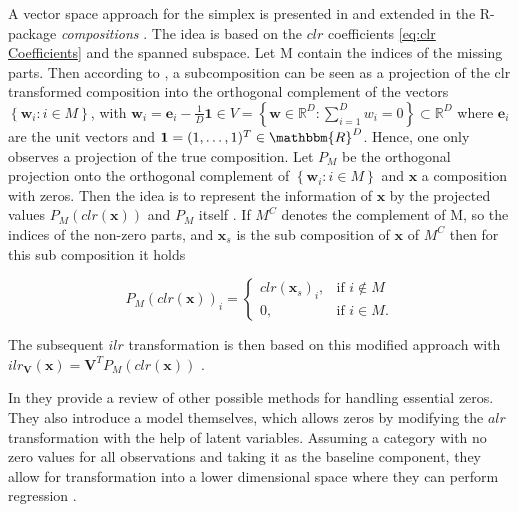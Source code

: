 A vector space approach for the simplex is presented in \cite{Boogaart:2006} and extended in the R-package \textit{compositions} \cite{Compositions:2023}. The idea is based on the $clr$ coefficients \ref{eq:clr Coefficients} and the spanned subspace. Let M contain the indices of the missing parts. Then according to \cite{Egozcue:2005}, a subcomposition can be seen as a projection of the clr transformed composition into the orthogonal complement of the vectors $\left\{\bm{w}_i: i \in M\right\}$, with $\bm{w}_i = \bm{e}_i - \frac{1}{D}\bm{1} \in V = \left\{\textbf{w} \in \mathbb{R}^D: \sum_{i=1}^D w_i=0\right\} \subset \mathbb{R}^D$ where $\bm{e}_i$ are the unit vectors and $\bm{1}=(1,\ldots,1)^T \in \mathbbm{R}^D$. Hence, one only observes a projection of the true composition. Let $P_M$ be the orthogonal projection onto the orthogonal complement of $\left\{\bm{w}_i: i \in M\right\}$ and $\bm{x}$ a composition with zeros. Then the idea is to represent the information of $\bm{x}$ by the projected values $P_M(clr(\bm{x}))$ and $P_M$ itself \cite{Boogaart:2006}. If $M^C$ denotes the complement of M, so the indices of the non-zero parts, and $\bm{x}_s$ is the sub composition of $\bm{x}$ of $M^C$ then for this sub composition it holds 

\begin{equation}
P_M(clr(\bm{x}))_i =
\begin{cases}
clr(\bm{x}_s)_i, & \text{if } i \notin M \\
0, & \text{if } i \in M.
\end{cases}
\label{eq:clr Projection}
\end{equation}

The subsequent $ilr$ transformation is then based on this modified approach with $ ilr_{\textbf{V}}(\textbf{x}) = \textbf{V}^T P_M(clr(\textbf{x}))$ \cite{Compositions:2023}.

In \cite{Leininger:2013} they provide a review of other possible methods for handling essential zeros. They also introduce a model themselves, which allows zeros by modifying the $alr$ transformation with the help of latent variables. Assuming a category with no zero values for all observations and taking it as the baseline component, they allow for transformation into a lower dimensional space where they can perform regression \cite{Leininger:2013}.

